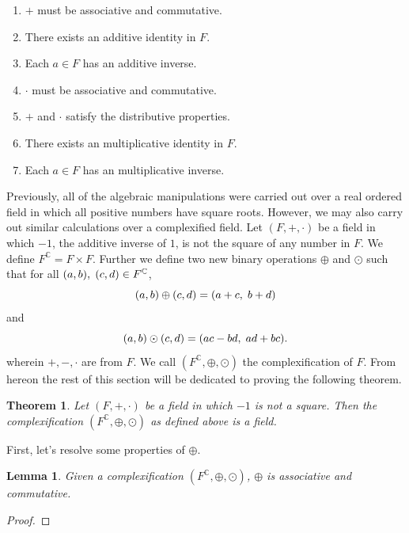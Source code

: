 \documentclass[12pt]{article}
\newcommand{\C}{\mathbb{C}}
\newcommand{\ttc}{, \hspace{1mm}}
\theoremstyle{plain}
\newtheorem{theorem}{Theorem}[section]
\newtheorem{lemma}{Lemma}[section]
\theoremstyle{definition}
\begin{document}
\begin{appendices}
\begin{enumerate}
	\item $+$ must be associative and commutative.
	\item There exists an additive identity in $F$.
	\item Each $a\in F$ has an additive inverse.
	\item $\cdot$ must be associative and commutative.
	\item $+$ and $\cdot$ satisfy the distributive properties.
	\item There exists an multiplicative identity in $F$.
	\item Each $a\in F$ has an multiplicative inverse.
\end{enumerate}
Previously, all of the algebraic manipulations were carried out over a real ordered field in which all positive numbers have square roots. However, we may also carry out similar calculations over a complexified field. Let $(F,+,\cdot)$ be a field in which $-1$, the additive inverse of $1$, is not the square of any number in $F$. We define $F^\C = F\times F$. Further we define two new binary operations $\oplus$ and $\odot$ such that for all $(a,b)\ttc (c,d)\in F^\C$,
	\[
		(a,b)\oplus(c,d) = (a + c\ttc b + d)
	\]
and
	\[
		(a,b)\odot(c,d) = (ac - bd\ttc ad + bc).
	\]
wherein $+,-,\cdot$ are from $F$. We call $(F^\C,\oplus,\odot)$ the complexification of $F$. From hereon the rest of this section will be dedicated to proving the following theorem.

\begin{theorem}
	Let $(F,+,\cdot)$ be a field in which $-1$ is not a square. Then the complexification $(F^\C,\oplus,\odot)$ as defined above is a field.
\end{theorem}

\noindent First, let's resolve some properties of $\oplus$.\\

\begin{lemma}
	Given a complexification $(F^\C,\oplus,\odot)$, $\oplus$ is associative and commutative.
\end{lemma}

\begin{proof}


\end{proof}
\end{appendices}
\end{document}
